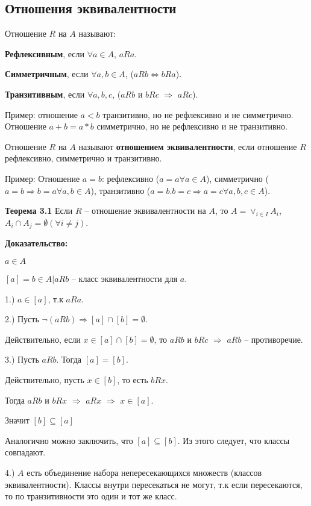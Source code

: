 \documentclass[openany]{article}
\begin{document}
   \subsection{Отношения эквивалентности}

   Отношение $R$ на $A$ называют:

   \textbf{Рефлексивным}, если $\forall a \in A$, $aRa$.

   \textbf{Симметричным}, если $\forall a, b \in A$, ($aRb \Leftrightarrow bRa$).

   \textbf{Транзитивным}, если $\forall a, b, c$, ($aRb$ и $bRc$ $\Rightarrow$ $aRc$).

   Пример: отношение $a < b$ транзитивно, но не рефлексивно и не симметрично. Отношение $a + b = a * b$ симметрично, но не рефлексивно и не транзитивно.

   Отношение $R$ на $A$ называют \textbf{отношением эквивалентности}, если отношение $R$ рефлексивно, симметрично и транзитивно.

   Пример: Отношение $a = b$: рефлексивно ($a = a \forall a \in A$), симметрично ($a = b \Rightarrow b = a \forall a, b \in A$), транзитивно ($a = b. b = c \Rightarrow a = c \forall a, b, c \in A$).

   \textbf{Теорема 3.1} Если $R$ -- отношение эквивалентности на $A$, то $A = \vee_{i \in I}A_i$, $A_i \cap A_j = \emptyset (\forall i \neq j)$.

   \textbf{Доказательство:}

   $a \in A$

   $[a] = {b \in A | aRb}$ -- класс эквивалентности для $a$.

   1.) $a \in [a]$, т.к $aRa$.

   2.) Пусть $\neg (aRb) \Rightarrow [a] \cap [b] = \emptyset$.

   Действительно, если $x \in [a] \cap [b] = \emptyset$, то $aRb$ и  $bRc$
 $\Rightarrow$ $aRb$ -- противоречие.

   3.) Пусть $aRb$. Тогда $[a] = [b]$.

   Действительно, пусть $x \in [b]$, то есть $bRx$.

   Тогда $aRb$ и $bRx$ $\Rightarrow$ $aRx$ $\Rightarrow$ $x \in [a]$.

   Значит $[b] \subseteq [a]$

   Аналогично можно заключить, что $[a] \subseteq [b]$. Из этого следует, что классы совпадают.

   4.) $A$ есть объединение набора непересекающихся множеств (классов эквивалентности). Классы внутри пересекаться не могут, т.к если пересекаются, то по транзитивности это один и тот же класс.
\end{document}
